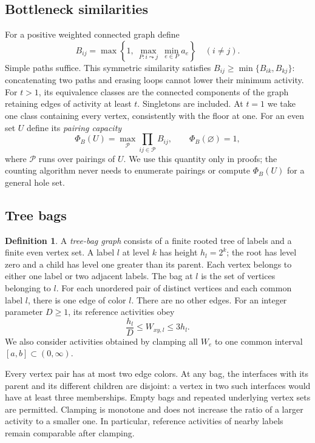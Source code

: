 \documentclass[11pt]{article}
\theoremstyle{definition}
\newtheorem{definition}[theorem]{Definition}
\theoremstyle{remark}
\numberwithin{equation}{section}
\begin{document}
\subsection{Bottleneck similarities}
For a positive weighted connected graph define
\begin{equation}\label{eq:bottleneck}
 B_{ij}=\max\left\{1,\ \max_{P:i\leadsto j}\ \min_{e\in P}a_e\right\}
 \quad (i\ne j).
\end{equation}
Simple paths suffice. This symmetric similarity satisfies
$B_{ij}\ge\min\{B_{ik},B_{kj}\}$: concatenating two paths and erasing
loops cannot lower their minimum activity. For $t>1$, its equivalence
classes are the connected components of the graph retaining edges of
activity at least $t$. Singletons are included. At $t=1$ we take one
class containing every vertex, consistently with the floor at one.
For an even set $U$ define its \emph{pairing capacity}
\begin{equation}\label{eq:pairing-capacity}
 \Phi_B(U)=\max_{\mathcal P}\prod_{ij\in\mathcal P}B_{ij},
 \qquad \Phi_B(\varnothing)=1,
\end{equation}
where $\mathcal P$ runs over pairings of $U$. We use this quantity only
in proofs; the counting algorithm never needs to enumerate pairings
or compute $\Phi_B(U)$ for a general hole set.

\subsection{Tree bags}
\begin{definition}\label{def:tree-bags}
A \emph{tree-bag graph} consists of a finite rooted tree of labels and
a finite even vertex set. A label $l$ at level $k$ has height $h_l=2^k$;
the root has level zero and a child has level one greater than its
parent. Each vertex belongs to either one label or two adjacent
labels. The bag at $l$ is the set of vertices belonging to $l$.
For each unordered pair of distinct vertices and each common label
$l$, there is one edge of color $l$. There are no other edges.
For an integer parameter $D\ge1$, its reference activities obey
\begin{equation}\label{eq:bag-weight-range}
 \frac{h_l}{D}\le W_{xy,l}\le3h_l.
\end{equation}
We also consider activities obtained by clamping all $W_e$ to one
common interval $[a,b]\subset(0,\infty)$.
\end{definition}

Every vertex pair has at most two edge colors. At any bag, the
interfaces with its parent and its different children are disjoint:
a vertex in two such interfaces would have at least three memberships.
Empty bags and repeated underlying vertex sets are permitted.
Clamping is monotone and does not increase the ratio of a larger
activity to a smaller one. In particular, reference activities of
nearby labels remain comparable after clamping.
\end{document}

